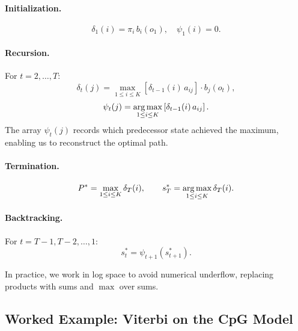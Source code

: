 \paragraph{Initialization.}
\begin{equation}
\label{eq:viterbi-init}
  \delta_1(i) = \pi_i \, b_i(o_1), \quad \psi_1(i) = 0.
\end{equation}

\paragraph{Recursion.}
For $t = 2, \ldots, T$:
\begin{equation}
\label{eq:viterbi-recursion}
  \delta_t(j) = \max_{1 \le i \le K} \left[ \delta_{t-1}(i) \, a_{ij} \right] \cdot b_j(o_t),
\end{equation}
\begin{equation}
\label{eq:viterbi-backtrack}
  \psi_t(j) = \operatorname*{arg\,max}_{1 \le i \le K} \left[ \delta_{t-1}(i) \, a_{ij} \right].
\end{equation}
The array $\psi_t(j)$ records which predecessor state achieved the maximum, enabling us to reconstruct the optimal path.

\paragraph{Termination.}
\begin{equation}
\label{eq:viterbi-termination}
  P^* = \max_{1 \le i \le K} \delta_T(i), \qquad s_T^* = \operatorname*{arg\,max}_{1 \le i \le K} \delta_T(i).
\end{equation}

\paragraph{Backtracking.}
For $t = T-1, T-2, \ldots, 1$:
\begin{equation}
\label{eq:viterbi-path}
  s_t^* = \psi_{t+1}(s_{t+1}^*).
\end{equation}

In practice, we work in log space to avoid numerical underflow, replacing products with sums and $\max$ over sums.

\subsection{Worked Example: Viterbi on the CpG Model}
\label{sec:viterbi-example}


